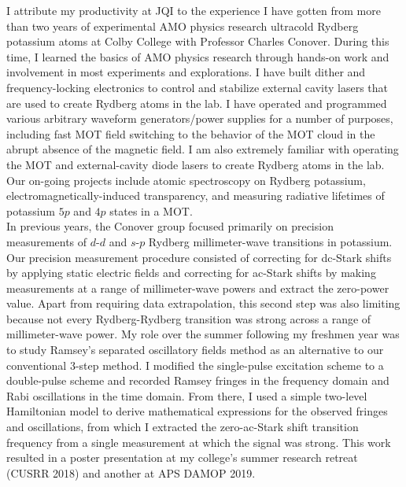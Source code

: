 \documentclass[12pt]{article}
\begin{document}
I attribute my productivity at JQI to the experience I have gotten from more than two years of experimental AMO physics research ultracold Rydberg potassium atoms at Colby College with Professor Charles Conover. During this time, I learned the basics of AMO physics research through hands-on work and involvement in most experiments and explorations. I have built dither and frequency-locking electronics to control and stabilize external cavity lasers that are used to create Rydberg atoms in the lab. I have operated and programmed various arbitrary waveform generators/power supplies for a number of purposes, including fast MOT field switching to the behavior of the MOT cloud in the abrupt absence of the magnetic field. I am also extremely familiar with operating the MOT and external-cavity diode lasers to create Rydberg atoms in the lab. Our on-going projects include atomic spectroscopy on Rydberg potassium, electromagnetically-induced transparency, and measuring radiative lifetimes of potassium $5p$ and $4p$ states in a MOT. \\


In previous years, the Conover group focused primarily on precision measurements of $d$-$d$ and $s$-$p$ Rydberg millimeter-wave transitions in potassium. Our precision measurement procedure consisted of correcting for dc-Stark shifts by applying static electric fields and correcting for ac-Stark shifts by making measurements at a range of millimeter-wave powers and extract the zero-power value. Apart from requiring data extrapolation, this second step was also limiting because not every Rydberg-Rydberg transition was strong across a range of millimeter-wave power. My role over the summer following my freshmen year was to study Ramsey's separated oscillatory fields method as an alternative to our conventional 3-step method. I modified the single-pulse excitation scheme to a double-pulse scheme and recorded Ramsey fringes in the frequency domain and Rabi oscillations in the time domain. From there, I used a simple two-level Hamiltonian model to derive mathematical expressions for the observed fringes and oscillations, from which I extracted the zero-ac-Stark shift transition frequency from a single measurement at which the signal was strong. This work resulted in a poster presentation at my college's summer research retreat (CUSRR 2018) and another at APS DAMOP 2019.  \\
\end{document}
